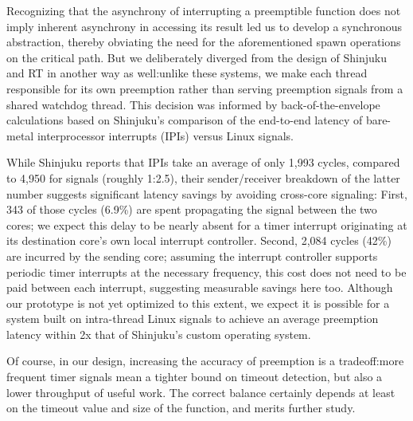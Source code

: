 Recognizing that the asynchrony of interrupting a preemptible function does not imply
inherent asynchrony in accessing its result led us to develop a synchronous
abstraction, thereby obviating the need for the aforementioned spawn operations on
the critical path.  But we deliberately diverged from the design of Shinjuku and RT
in another way as well:\@ unlike these systems, we make each thread responsible for
its own preemption rather than serving preemption signals from a shared watchdog
thread.  This decision was informed by back-of-the-envelope calculations based on
Shinjuku's comparison of the end-to-end latency of bare-metal interprocessor
interrupts (IPIs) versus Linux signals.

While Shinjuku reports that IPIs take an average of only 1,993 cycles, compared to
4,950 for signals (roughly 1:2.5), their sender/receiver breakdown of the latter
number suggests significant latency savings by avoiding cross-core signaling:
First, 343 of those cycles (6.9\%) are spent propagating the signal between the two
cores; we expect this delay to be nearly absent for a timer interrupt originating at
its destination core's own local interrupt controller.  Second, 2,084 cycles (42\%)
are incurred by the sending core; assuming the interrupt controller supports
periodic timer interrupts at the necessary frequency, this cost does not need to be
paid between each interrupt, suggesting measurable savings here too.  Although
our prototype is not yet optimized to this extent, we expect it is possible for a
system built on intra-thread Linux signals to achieve an average preemption latency
within 2x that of Shinjuku's custom operating system.

Of course, in our design, increasing the accuracy of preemption is a tradeoff:\@ more
frequent timer signals mean a tighter bound on timeout detection, but also a lower
throughput of useful work.  The correct balance certainly depends at least on the
timeout value and size of the function, and merits further study.


